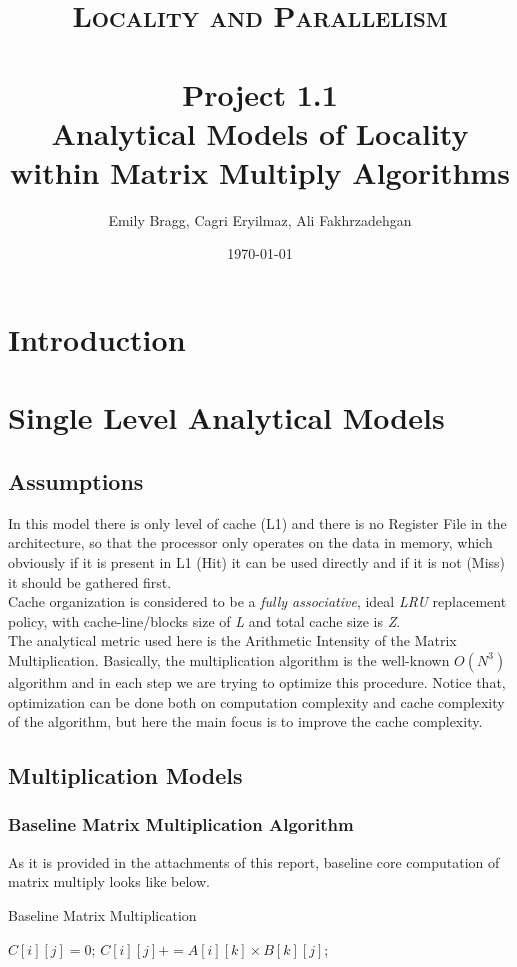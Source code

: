 \documentclass[paper=a4, fontsize=11pt]{scrartcl} %
\title{	
\normalfont \normalsize 
\textsc{Locality and Parallelism} \\ [25pt] %
\horrule{0.5pt} \\[0.4cm] %
\huge Project 1.1 \\ %
\huge Analytical Models of Locality within Matrix Multiply Algorithms
\horrule{2pt} \\[0.5cm] %
}
\author{Emily Bragg, Cagri Eryilmaz, Ali Fakhrzadehgan} %
\date{\normalsize\today} %
\numberwithin{equation}{section} %
\numberwithin{figure}{section} %
\numberwithin{table}{section} %
\begin{document}
\maketitle %

\newpage

\section{Introduction}

\section{Single Level Analytical Models}
\subsection{Assumptions}
In this model there is only level of cache (L1) and there is no Register File in the architecture, so that the processor only operates on the data in memory, which obviously if it is present in L1 (Hit) it can be used directly and if it is not (Miss) it should be gathered first.\\
Cache organization is considered to be a \textit{fully associative}, ideal \textit{LRU} replacement policy, with cache-line/blocks size of \textit{L} and total cache size is \textit{Z}.\\
The analytical metric used here is the Arithmetic Intensity of the Matrix Multiplication. Basically, the multiplication algorithm is the well-known $O(N^{3})$ algorithm and in each step we are trying to optimize this procedure. Notice that, optimization can be done both on computation complexity and cache complexity of the algorithm, but here the main focus is to improve the cache complexity. 

\subsection{Multiplication Models}

\subsubsection{Baseline Matrix Multiplication Algorithm}
As it is provided in the attachments of this report, baseline core computation of matrix multiply looks like below.\\

\begin{algorithm}
\caption{Baseline Matrix Multiplication}
\label{Base-Alg}
\begin{algorithmic}
		\State $C[ i ][ j ] = 0$;
		\State $C[ i ][ j ] += A[ i ][ k ] \times B[ k ][ j ]$; 
		\EndFor
	\EndFor
\EndFor
\end{algorithmic}
\end{algorithm}
\end{document}

